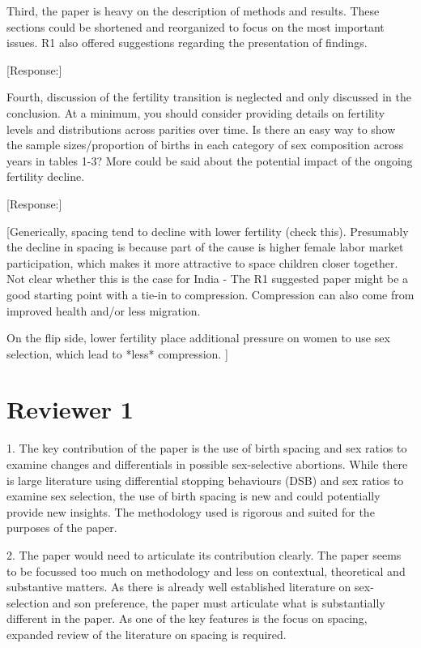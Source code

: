 \documentclass[letterpaper,12pt]{article}
\begin{document}
Third, the paper is heavy on the description of methods and results.
These sections could be shortened and reorganized to focus on the most
important issues. R1 also offered suggestions regarding the presentation
of findings.

[Response:]

Fourth, discussion of the fertility transition is neglected and only
discussed in the conclusion. At a minimum, you should consider providing
details on fertility levels and distributions across parities over time.
Is there an easy way to show the sample sizes/proportion of births in
each category of sex composition across years in tables 1-3? More could
be said about the potential impact of the ongoing fertility decline.

[Response:]

[Generically, spacing tend to decline with lower fertility (check this). 
Presumably the decline in spacing is because part of the cause is higher female labor 
market participation, which makes it more attractive to space children closer together.
Not clear whether this is the case for India - The R1 suggested paper might be a good
starting point with a tie-in to compression.
Compression can also come from improved health and/or less migration.

On the flip side, lower fertility place additional pressure on women to use
sex selection, which lead to *less* compression.
]

\newpage

\section*{Reviewer 1}


1. The key contribution of the paper is the use of birth spacing and sex
ratios to examine changes and differentials in possible sex-selective
abortions. While there is large literature using differential stopping
behaviours (DSB) and sex ratios to examine sex selection, the use of
birth spacing is new and could potentially provide new insights. The
methodology used is rigorous and suited for the purposes of the paper.

2. The paper would need to articulate its contribution clearly. The
paper seems to be focussed too much on methodology and less on
contextual, theoretical and substantive matters. As there is already
well established literature on sex-selection and son preference, the
paper must articulate what is substantially different in the paper. As
one of the key features is the focus on spacing, expanded review of the
literature on spacing is required.
\end{document}

